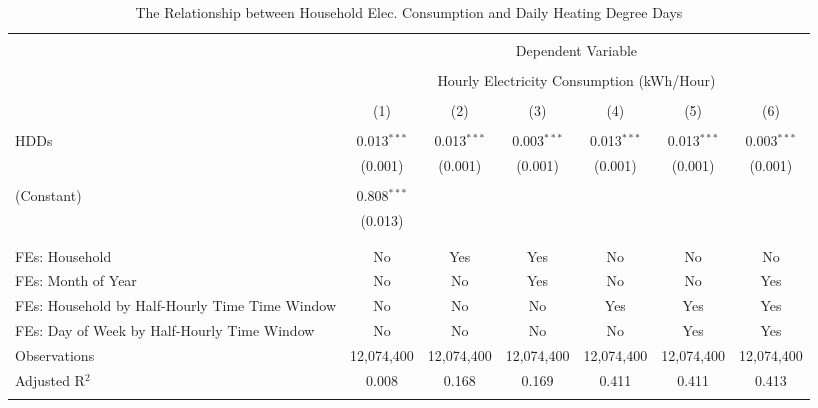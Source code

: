 
\begin{table}[!htbp] \centering 
  \caption{The Relationship between Household Elec. Consumption and Daily Heating Degree Days} 
  \label{Table:Relationship-between-Household-Electricity-Consumption-and-Daily-HDDs} 
\small 
\begin{tabular}{@{\extracolsep{95pt}}lcccccc} 
\\[-1.8ex]\hline 
\hline \\[-1.8ex] 
 & \multicolumn{6}{c}{Dependent Variable} \\ 
\cline{2-7} 
\\[-1.8ex] & \multicolumn{6}{c}{Hourly Electricity Consumption  (kWh/Hour)} \\ 
\\[-1.8ex] & (1) & (2) & (3) & (4) & (5) & (6)\\ 
\hline \\[-1.8ex] 
 HDDs & 0.013$^{***}$ & 0.013$^{***}$ & 0.003$^{***}$ & 0.013$^{***}$ & 0.013$^{***}$ & 0.003$^{***}$ \\ 
  & (0.001) & (0.001) & (0.001) & (0.001) & (0.001) & (0.001) \\ 
  & & & & & & \\ 
 (Constant) & 0.808$^{***}$ &  &  &  &  &  \\ 
  & (0.013) &  &  &  &  &  \\ 
  & & & & & & \\ 
\hline \\[-1.8ex] 
FEs: Household & No & Yes & Yes & No & No & No \\ 
FEs: Month of Year & No & No & Yes & No & No & Yes \\ 
FEs: Household by Half-Hourly Time Time Window & No & No & No & Yes & Yes & Yes \\ 
FEs: Day of Week by Half-Hourly Time Window & No & No & No & No & Yes & Yes \\ 
Observations & 12,074,400 & 12,074,400 & 12,074,400 & 12,074,400 & 12,074,400 & 12,074,400 \\ 
Adjusted R$^{2}$ & 0.008 & 0.168 & 0.169 & 0.411 & 0.411 & 0.413 \\ 
\hline 
\hline \\[-1.8ex] 
\end{tabular} 
\end{table} 
